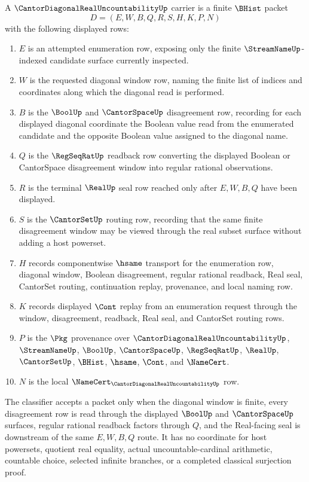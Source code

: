 \begin{definition}
\label{def:cantor-diagonal-real-uncountability-carrier}
A $\CantorDiagonalRealUncountabilityUp$ carrier is a finite $\BHist$ packet
$$
D=(E,W,B,Q,R,S,H,K,P,N)
$$
with the following displayed rows:
\begin{enumerate}
\item $E$ is an attempted enumeration row, exposing only the finite $\StreamNameUp$-indexed candidate surface currently inspected.
\item $W$ is the requested diagonal window row, naming the finite list of indices and coordinates along which the diagonal read is performed.
\item $B$ is the $\BoolUp$ and $\CantorSpaceUp$ disagreement row, recording for each displayed diagonal coordinate the Boolean value read from the enumerated candidate and the opposite Boolean value assigned to the diagonal name.
\item $Q$ is the $\RegSeqRatUp$ readback row converting the displayed Boolean or CantorSpace disagreement window into regular rational observations.
\item $R$ is the terminal $\RealUp$ seal row reached only after $E,W,B,Q$ have been displayed.
\item $S$ is the $\CantorSetUp$ routing row, recording that the same finite disagreement window may be viewed through the real subset surface without adding a host powerset.
\item $H$ records componentwise $\hsame$ transport for the enumeration row, diagonal window, Boolean disagreement, regular rational readback, Real seal, CantorSet routing, continuation replay, provenance, and local naming row.
\item $K$ records displayed $\Cont$ replay from an enumeration request through the window, disagreement, readback, Real seal, and CantorSet routing rows.
\item $P$ is the $\Pkg$ provenance over $\CantorDiagonalRealUncountabilityUp$, $\StreamNameUp$, $\BoolUp$, $\CantorSpaceUp$, $\RegSeqRatUp$, $\RealUp$, $\CantorSetUp$, $\BHist$, $\hsame$, $\Cont$, and $\NameCert$.
\item $N$ is the local $\NameCert_{\CantorDiagonalRealUncountabilityUp}$ row.
\end{enumerate}
The classifier accepts a packet only when the diagonal window is finite, every disagreement row is read through the displayed $\BoolUp$ and $\CantorSpaceUp$ surfaces, regular rational readback factors through $Q$, and the Real-facing seal is downstream of the same $E,W,B,Q$ route. It has no coordinate for host powersets, quotient real equality, actual uncountable-cardinal arithmetic, countable choice, selected infinite branches, or a completed classical surjection proof.
\end{definition}

